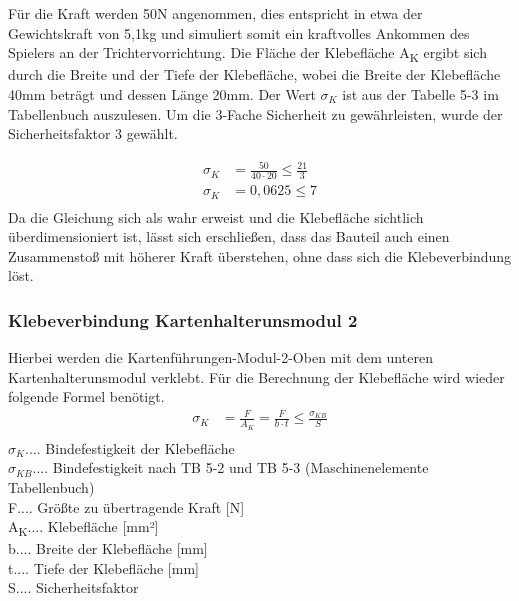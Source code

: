 Für die Kraft werden 50N angenommen, dies entspricht in etwa der Gewichtskraft von 5,1kg
und simuliert somit ein kraftvolles Ankommen des Spielers an der Trichtervorrichtung.
Die Fläche der Klebefläche A\textsubscript{K} ergibt sich durch die Breite und der Tiefe der Klebefläche, wobei
die Breite der Klebefläche  40mm beträgt und dessen Länge 20mm.
Der Wert $\sigma_{K}$ ist aus der Tabelle 5-3 im Tabellenbuch  auszulesen.
Um die 3-Fache Sicherheit zu gewährleisten, wurde der Sicherheitsfaktor 3 gewählt.

\begin{align*}
\sigma _{K} &= \frac{50}{40\cdot 20}\leq \frac{21}{3}\\
\sigma _{K} &= 0,0625\leq 7\\
\end{align*}
Da die Gleichung sich als wahr erweist und die Klebefläche sichtlich überdimensioniert ist, lässt sich erschließen,
dass das Bauteil auch einen Zusammenstoß mit höherer Kraft überstehen, ohne dass sich die Klebeverbindung löst.

\subsubsection{Klebeverbindung Kartenhalterunsmodul 2} \label{subsubsec:KlebMod2}
Hierbei werden die Kartenführungen-Modul-2-Oben mit dem unteren Kartenhalterunsmodul verklebt.
Für die Berechnung der Klebefläche wird wieder folgende Formel benötigt.
\begin{align*}
\sigma _{K} &= \frac{F}{A_{K}} = \frac{F}{b\cdot t}\leq \frac{\sigma _{KB}}{S}\\
\end{align*}
$\sigma_{K}$.... Bindefestigkeit der Klebefläche \\
$\sigma_{KB}$.... Bindefestigkeit nach TB 5-2 und TB 5-3 (Maschinenelemente Tabellenbuch)\\
F.... Größte zu übertragende Kraft [N]\\
A\textsubscript{K}.... Klebefläche [mm²]\\
b.... Breite der Klebefläche [mm]\\
t.... Tiefe der Klebefläche [mm]\\
S.... Sicherheitsfaktor\\

